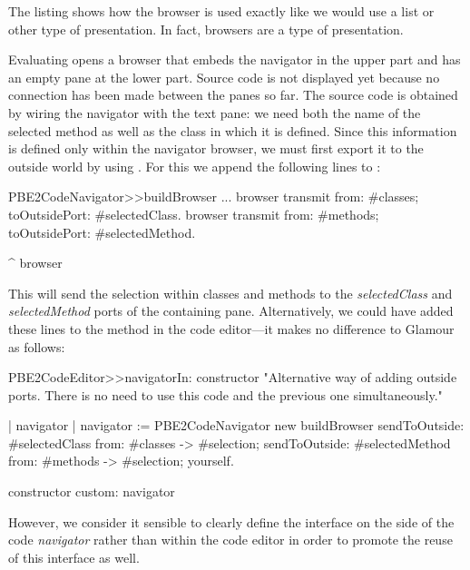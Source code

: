 \documentclass[a4paper,10pt,twoside]{book}
\begin{document}
The listing shows how the browser is used exactly like we would use a
list or other type of presentation. In fact, browsers are a type of
presentation.

Evaluating  opens a browser that embeds the navigator in the upper part and has an empty
pane at the lower part. Source code is not displayed yet because no connection has been made between the panes so far. The source code is obtained by wiring the navigator with the text pane: we need both the name of the selected method as well as the
class in which it is defined. Since this information is defined only
within the navigator browser, we must first export it to the outside
world by using . For this we
append the following lines to :

\begin{code}{}
PBE2CodeNavigator>>buildBrowser
  ...
  browser transmit from: #classes; toOutsidePort:  #selectedClass. 
  browser transmit from: #methods; toOutsidePort:  #selectedMethod.
  
  ^ browser
\end{code}

This will send the selection within classes and methods to the
\emph{selectedClass} and \emph{selectedMethod} ports of the containing
pane. Alternatively, we could have added these lines to the
 method in the code editor---it makes no difference
to Glamour as follows:

\begin{code}{}
PBE2CodeEditor>>navigatorIn: constructor
  "Alternative way of adding outside ports. There is no need to use this
   code and the previous one simultaneously."

  | navigator |
  navigator := PBE2CodeNavigator new buildBrowser
          sendToOutside: #selectedClass from: #classes -> #selection;
          sendToOutside: #selectedMethod from: #methods -> #selection;
          yourself.
  
  constructor custom: navigator
\end{code}

However, we consider it sensible to clearly define the interface on
the side of the code \emph{navigator} rather than within the code
editor in order to promote the reuse of this interface as well.


\end{document}
